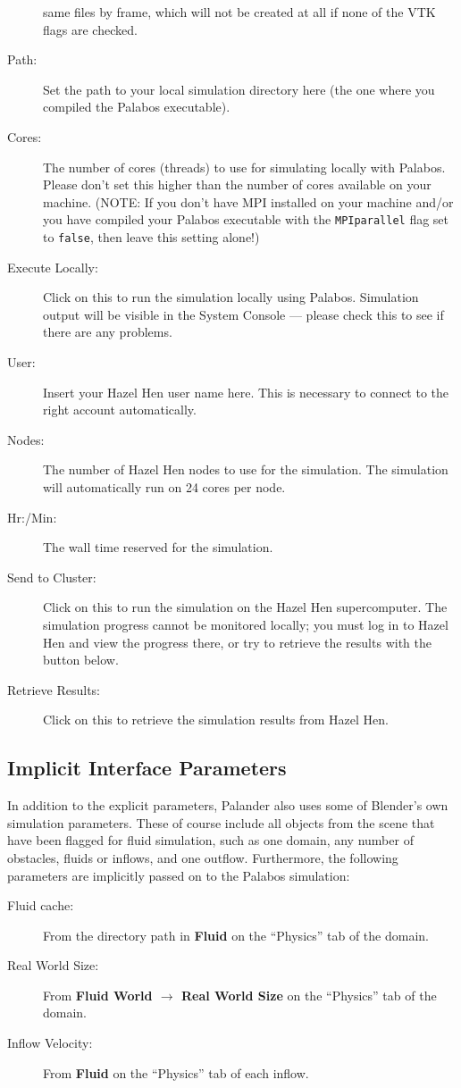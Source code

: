 \documentclass[12pt]{article}
\begin{document}
\begin{description}
same files by frame, which will not be created at all if none of the VTK flags are checked.
\item[Path:] Set the path to your local simulation directory here (the one where you compiled the Palabos 
executable).
\item[Cores:] The number of cores (threads) to use for simulating locally with Palabos. Please don't set this 
higher than the number of cores available on your machine. (NOTE: If you don't have MPI installed on your 
machine and/or you have compiled your Palabos executable with the \verb|MPIparallel| flag set to 
\verb|false|, then leave this setting alone!)
\item[Execute Locally:] Click on this to run the simulation locally using Palabos. Simulation output will be 
visible in the System Console --- please check this to see if there are any problems.
\item[User:] Insert your Hazel Hen user name here. This is necessary to connect to the right account 
automatically.
\item[Nodes:] The number of Hazel Hen nodes to use for the simulation. The simulation will automatically run 
on 24 cores per node.
\item[Hr:/Min:] The wall time reserved for the simulation.
\item[Send to Cluster:] Click on this to run the simulation on the Hazel Hen supercomputer. The simulation 
progress cannot be monitored locally; you must log in to Hazel Hen and view the progress there, or try to 
retrieve the results with the button below.
\item[Retrieve Results:] Click on this to retrieve the simulation results from Hazel Hen.
\end{description}

\subsection{Implicit Interface Parameters}

In addition to the explicit parameters, Palander also uses some of Blender's own simulation parameters. These 
of course include all objects from the scene that have been flagged for fluid simulation, such as one domain, 
any number of obstacles, fluids or inflows, and one outflow. Furthermore, the following parameters are 
implicitly passed on to the Palabos simulation:
\begin{description}
\item[Fluid cache:] From the directory path in {\bf Fluid} on the ``Physics'' tab of the domain.
\item[Real World Size:] From {\bf Fluid World $\to$ Real World Size} on the ``Physics'' tab of the domain.
\item[Inflow Velocity:] From {\bf Fluid} on the ``Physics'' tab of each inflow.
\end{description}
\end{document}

